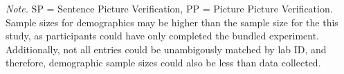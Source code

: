 \documentclass[
  man,mask,floatsintext]{apa7}
\begin{document}
\begin{table}[tbp]
\begin{center}
\begin{threeparttable}
{}

\begin{tablenotes}[para]
\normalsize{\textit{Note.} SP = Sentence Picture Verification, PP = Picture Picture Verification. Sample sizes for demographics may be higher than the sample size for the this study, as participants could have only completed the bundled experiment. Additionally, not all entries could be unambigously matched by lab ID, and therefore, demographic sample sizes could also be less than data collected.}
\end{tablenotes}

\end{threeparttable}
\end{center}

\end{table}

\newpage
\end{document}
